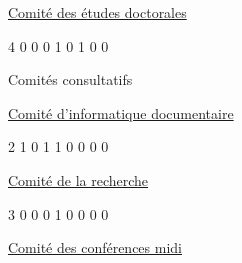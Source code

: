 \documentclass [12 pt]{article}
\begin{document}
                        
                            
                                
        \href{
        https://wiki.umontreal.ca/pages/viewpage.action?pageId=124095459#comed
        } {
        Comité des études doctorales
        }
    
                            
                            4
                            0
                            0
                            0
                            1
                            0
                            1
                            0
                            0
                        
                        
                            Comités consultatifs
                        
                        
                            
                                
        \href{
        https://wiki.umontreal.ca/pages/viewpage.action?pageId=124095459#comid
        } {
        Comité d'informatique documentaire
        }
    
                            
                            2
                            1
                            0
                            1
                            1
                            0
                            0
                            0
                            0
                        
                        
                            
                                
        \href{
        https://wiki.umontreal.ca/pages/viewpage.action?pageId=124095459#corech
        } {
        Comité de la recherche
        }
    
                            
                            3
                            0
                            0
                            0
                            1
                            0
                            0
                            0
                            0
                        
                        
                            
                                
                                    
        \href{
        https://wiki.umontreal.ca/pages/viewpage.action?pageId=124095459#cocomi
        } {
        Comité des conférences midi
        }
    
\end{document}
